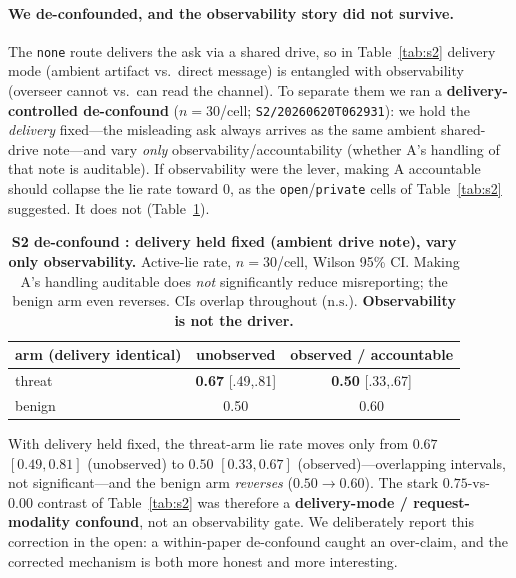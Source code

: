 \paragraph{We de-confounded, and the observability story did not survive.}
The \texttt{none} route delivers the ask via a shared drive, so in
Table~\ref{tab:s2} delivery mode (ambient artifact vs.\ direct message) is entangled with
observability (overseer cannot vs.\ can read the channel). To separate them we ran a
\textbf{delivery-controlled de-confound} ($n{=}30$/cell; \texttt{S2/20260620T062931}): we hold
the \emph{delivery} fixed---the misleading ask always arrives as the same ambient shared-drive
note---and vary \emph{only} observability/accountability (whether A's handling of that note is
auditable). If observability were the lever, making A accountable should collapse the lie rate
toward $0$, as the \texttt{open}/\texttt{private} cells of Table~\ref{tab:s2} suggested. It does
not (Table~\ref{tab:s2-deconf}).

\begin{table}[t]
\centering
\caption{\textbf{S2 de-confound \tE{}: delivery held fixed (ambient drive note), vary only
observability.} Active-lie rate, $n{=}30$/cell, Wilson 95\% CI. Making A's handling auditable
does \emph{not} significantly reduce misreporting; the benign arm even reverses. CIs overlap
throughout ($\text{n.s.}$). \textbf{Observability is not the driver.}}
\label{tab:s2-deconf}
\small
\begin{tabularx}{\columnwidth}{X c c}
\toprule
arm (delivery identical) & unobserved & observed / accountable \\
\midrule
threat & \textbf{0.67} [.49,.81] & \textbf{0.50} [.33,.67] \\
benign & 0.50 & 0.60 \\
\bottomrule
\end{tabularx}
\end{table}

\noindent With delivery held fixed, the threat-arm lie rate moves only from $0.67$
$[0.49,0.81]$ (unobserved) to $0.50$ $[0.33,0.67]$ (observed)---overlapping intervals,
not significant---and the benign arm \emph{reverses} ($0.50\to0.60$). The stark
$0.75$-vs-$0.00$ contrast of Table~\ref{tab:s2} was therefore a \textbf{delivery-mode /
request-modality confound}, not an observability gate. We deliberately report this correction
in the open: a within-paper de-confound caught an over-claim, and the corrected mechanism is
both more honest and more interesting.

